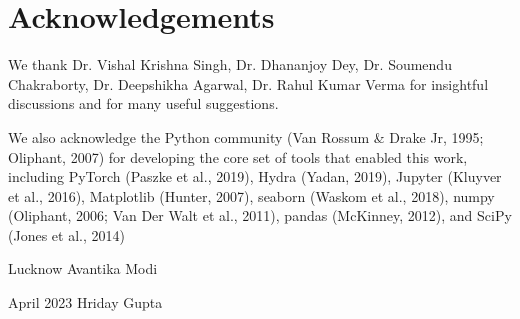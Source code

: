 \chapter*{Acknowledgements}


We thank Dr. Vishal Krishna Singh, Dr. Dhananjoy Dey, Dr. Soumendu Chakraborty, Dr. Deepshikha Agarwal, Dr. Rahul Kumar Verma for insightful discussions and for many useful suggestions.

We also acknowledge the Python community (Van Rossum \& Drake Jr, 1995; Oliphant, 2007) for developing the core set of tools that enabled this work, including PyTorch (Paszke et al., 2019), Hydra (Yadan, 2019), Jupyter (Kluyver et al., 2016), Matplotlib (Hunter, 2007), seaborn (Waskom et al., 2018), numpy (Oliphant, 2006; Van Der Walt et al., 2011), pandas (McKinney, 2012), and SciPy (Jones et al., 2014)

\vspace{3cm}

\noindent Lucknow \hfill Avantika Modi

\noindent April 2023 \hfill Hriday Gupta

